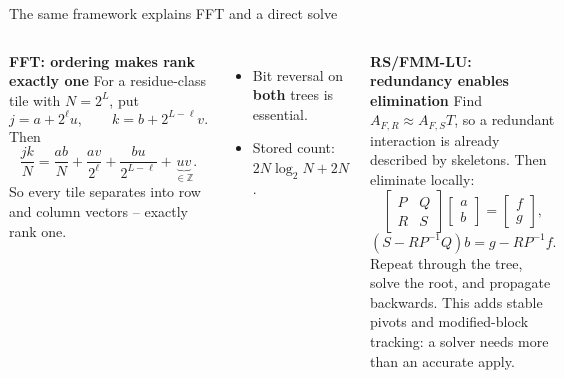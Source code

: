 \documentclass[aspectratio=169,11pt]{beamer}
\begin{document}
\begin{frame}{The same framework explains FFT and a direct solve}
\begin{columns}[T]
 \textbf{FFT: ordering makes rank exactly one}
 \small
 For a residue-class tile with $N=2^L$, put
 \[
  j=a+2^\ell u,\qquad k=b+2^{L-\ell}v.
 \]
 Then
 \[
  \frac{jk}{N}=\frac{ab}{N}+\frac{av}{2^\ell}+\frac{bu}{2^{L-\ell}}+\underbrace{uv}_{\in\mathbb Z}.
 \]
 So every tile separates into row and column vectors -- exactly rank one.
 \begin{itemize}
  \item Bit reversal on \textbf{both} trees is essential.
  \item Stored count: $2N\log_2N+2N$.
 \end{itemize}
 \textbf{RS/FMM-LU: redundancy enables elimination}
 \small
 Find $A_{F,R}\approx A_{F,S}T$, so a redundant interaction is already described by skeletons. Then eliminate locally:
 \[
  \begin{bmatrix}P&Q\\R&S\end{bmatrix}
  \begin{bmatrix}a\\b\end{bmatrix}
  =\begin{bmatrix}f\\g\end{bmatrix},
 \]
 \[
  (S-RP^{-1}Q)b=g-RP^{-1}f.
 \]
 Repeat through the tree, solve the root, and propagate backwards.
 \vspace{1mm}
 \small This adds stable pivots and modified-block tracking: a solver needs more than an accurate apply.
\end{columns}
\end{frame}
\end{document}
